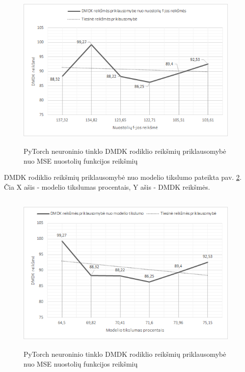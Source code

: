 \documentclass{VUMIFInfBakalaurinis}
\begin{document}
\begin{figure}[h]
  \centering
  \includegraphics[width=11cm,height=8cm,keepaspectratio]{img/pap_tyr_1.png}
  \caption{PyTorch neuroninio tinklo DMDK rodiklio reikšmių priklausomybė nuo MSE nuostolių funkcijos reikšmių}
  \label{fig:PyTorch neuroninio tinklo DMDK rodiklio reikšmių priklausomybė nuo MSE nuostolių funkcijos reikšmių}
\end{figure}

\par DMDK rodiklio reikšmių priklausomybė nuo modelio tikslumo pateikta pav. \ref{fig:PyTorch neuroninio tinklo DMDK rodiklio reikšmių priklausomybė nuo MSE nuostolių funkcijos reikšmių}. Čia X ašis - modelio tikslumas procentais, Y ašis - DMDK reikšmės.

\begin{figure}[h]
  \centering
  \includegraphics[width=11cm,height=8cm,keepaspectratio]{img/pap_tyr_2.png}
  \caption{PyTorch neuroninio tinklo DMDK rodiklio reikšmių priklausomybė nuo MSE nuostolių funkcijos reikšmių}
  \label{fig:PyTorch neuroninio tinklo DMDK rodiklio reikšmių priklausomybė nuo MSE nuostolių funkcijos reikšmių}
\end{figure}
\end{document}

